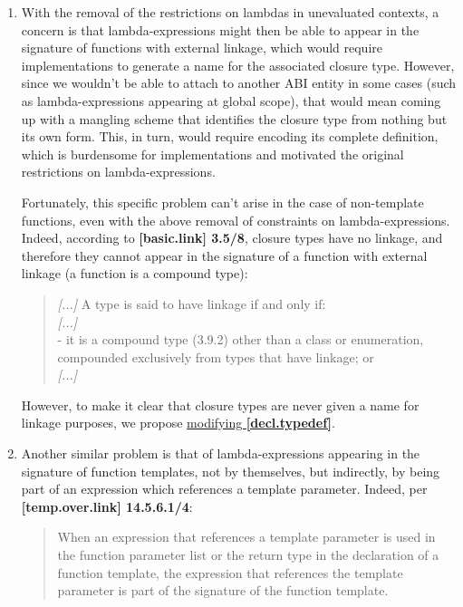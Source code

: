 \documentclass{wg21}
\begin{document}
\begin{enumerate}
  \item \label{discussion.non-template}
  With the removal of the restrictions on lambdas in unevaluated contexts,
  a concern is that lambda-expressions might then be able to appear in the
  signature of functions with external linkage, which would require implementations
  to generate a name for the associated closure type. However, since we wouldn't
  be able to attach to another ABI entity in some cases (such as lambda-expressions
  appearing at global scope), that would mean coming up with a mangling scheme
  that identifies the closure type from nothing but its own form. This, in turn,
  would require encoding its complete definition, which is burdensome for
  implementations and motivated the original restrictions on lambda-expressions.

  Fortunately, this specific problem can't arise in the case of non-template
  functions, even with the above removal of constraints on lambda-expressions.
  Indeed, according to \textbf{[basic.link] 3.5/8}, closure types have no linkage,
  and therefore they cannot appear in the signature of a function with external
  linkage (a function is a compound type):
  \begin{quote}
    \textit{[...]} A type is said to have linkage if and only if:\\
    \textit{[...]}\\
    - it is a compound type (3.9.2) other than a class or enumeration,
      compounded exclusively from types that have linkage; or \\
    \textit{[...]}
  \end{quote}

  However, to make it clear that closure types are never given a name for
  linkage purposes, we propose \hyperref[wording.non-template]{modifying
  \textbf{[decl.typedef]}}.


  \item \label{discussion.template}
  Another similar problem is that of lambda-expressions appearing in the
  signature of function templates, not by themselves, but indirectly, by being
  part of an expression which references a template parameter. Indeed, per
  \textbf{[temp.over.link] 14.5.6.1/4}:
  \begin{quote}
    When an expression that references a template parameter is used in the
    function parameter list or the return type in the declaration of a function
    template, the expression that references the template parameter is part of
    the signature of the function template.
  \end{quote}


\end{enumerate}
\end{document}
